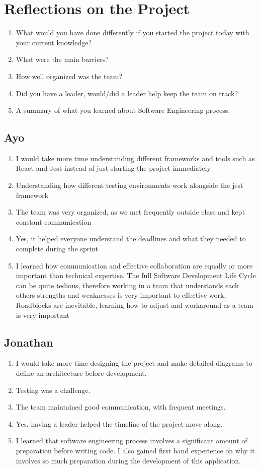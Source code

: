 \section{Reflections on the Project}
\begin{enumerate}
    \item What would you have done differently if you started the project today with your current knowledge? 
    \item What were the main barriers? 
    \item How well organized was the team?
    \item Did you have a leader, would/did a leader help keep the team on track?
    \item A summary of what you learned about Software Engineering process.
\end{enumerate}


\subsection{Ayo}
\begin{enumerate}
    \item I would take more time understanding different frameworks and tools such as React and Jest instead of just starting the project immediately 
    \item Understanding how different testing environments work alongside the jest framework
    \item The team was very organized, as we met frequently outside class and kept constant communication
    \item Yes, it helped everyone understand the deadlines and what they needed to complete during the sprint
    \item I learned how communication and effective collaboration are equally or more important than technical expertise. The full Software Development Life Cycle can be quite tedious, therefore working in a team that understands each others strengths and weaknesses is very important to effective work, Roadblocks are inevitable, learning how to adjust and workaround as a team is very important
\end{enumerate}

\subsection{Jonathan}
\begin{enumerate}
    \item I would take more time designing the project and make detailed diagrams to define an architecture before development. 
    \item Testing was a challenge. 
    \item The team maintained good communication, with frequent meetings.
    \item Yes, having a leader helped the timeline of the project move along. 
    \item I learned that software engineering process involves a significant amount of preparation before writing code. I also gained first hand experience on why it involves so much preparation during the development of this application. 
\end{enumerate}

